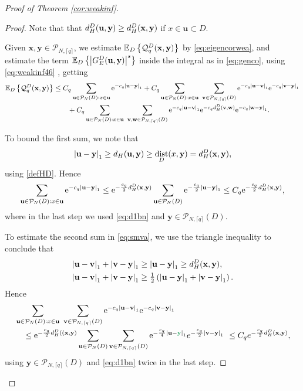 \documentclass[12pt, a4paper,reqno]{amsart}
\newcommand{\fg}{\color{ForestGreen}}
\numberwithin{equation}{section}
\DeclareMathOperator{\dist}{dist}
\newcommand\x{\mathbf{x}}
\newcommand\y{\mathbf{y}}
\renewcommand\u{\mathbf{u}}
\newcommand\e{\mathrm{e}}
\newcommand\E{\mathbb E}
\newcommand\cQ{\mathcal{Q}}
\newcommand\cP{\mathcal{P}}
\newcommand\be{\begin{equation}\begin{aligned}}
\newcommand\ee{\end{aligned}\end{equation}}
\newcommand{\abs}[1]{\left\lvert #1 \right\rvert}
\newcommand{\set}[1]{\left\{ #1 \right\}}
\newcommand{\pa}[1]{\left( #1 \right)}
\newcommand{\cl}[1]{\lceil #1 \rceil}
\newcommand{\eq}[1]{\eqref{#1}}
\begin{document}
\begin{proof}[Proof of  Theorem \ref{cor:weakinf}]
\begin{proof}
  
Note that that  $d^D_{H}({\bf u}, {\bf y})\ge d^D_{H}({\bf x}, {\bf y})$  if $x\in \u \subset D$.

 Given $\x,\y\in \cP_{N,\cl{q}}$,  we estimate $\E_{D}\set{\cQ_q^D({\bf x},{\bf y})}$ by  \eqref{eq:eigencorwea}, and estimate the term 
$\E_{D}\set{\abs{G_E^D ({\bf u},{\bf y})}^s}$ inside the integral as in \eqref{eq:genco}, using \eq{eq:weakinf46} ,  getting
\be \label{eq:smva}
\E_{D}\set{\cQ_q^D({\bf x},{\bf y})}&\le C_q \sum_{{\bf u}\in \cP_N(D): x\in {\bf u}}\e^{-c_q\abs{{\bf u}-{\bf y}}_1}+C_q  \sum_{{\bf u}\in \cP_N(D): x\in {\bf u}}\ \sum_{{\bf v}\in \cP_{N,\cl{q}}(D)}\e^{-c_q\abs{{\bf u}-{\bf v}}_1}\e^{-c_q\abs{{\bf v}-{\bf y}}_1}\\& \quad  \quad +C_q\sum_{{\bf u}\in \cP_N(D): x\in {\bf u}}\ \sum_{{\bf v},{\bf w}\in \cP_{N,\cl{q}}(D)}\e^{-c_q\abs{{\bf u}-{\bf v}}_1}\e^{-c_qd^D_H\pa{{\bf v},{\bf w}}}\e^{-c_q\abs{{\bf w}-{\bf y}}_1}.
\ee



To bound the first sum, we note that 
\be\label{defHD32}
\abs{{\bf u}-{\bf y}}_1\ge d_H({{\bf u},{\bf y}})\ge  \dist_D (x, {\bf y})=d_{H}^D({\bf x}, {\bf y}),
\ee
using \eqref{defHD}. Hence 
\be\label{eq:smva2}
\sum_{{\bf u}\in \cP_N(D): x\in {\bf u}}\e^{-c_q\abs{{\bf u}-{\bf y}}_1} \le \e^{-\frac {c_q}2d_{H}^D({\bf x}, {\bf y})}\sum_{{\bf u}\in \cP_N(D)} \e^{-\frac {c_q}2\abs{{\bf u}-{\bf y}}_1}   \le   C_{q} \e^{-\frac  {c_q} 2d_{H}^D({\bf x}, {\bf y})},
\ee
 where in the last step we used \eqref{eq:d1bn}  and $\y\in \cP_{N,\cl{q}}(D)$.
 
 To estimate the second sum in \eqref{eq:smva}, we use  the triangle inequality to conclude that 
\be
\abs{{\bf u}-{\bf v}}_1+\abs{{\bf v}-{\bf y}}_1&\ge \abs{{\bf u}-{\bf y}}_1\ge d_{H}^D({\bf x},{\bf y}),\\
\abs{{\bf u}-{\bf v}}_1+\abs{{\bf v}-{\bf y}}_1&\ge \tfrac12\pa{\abs{{\bf u}-{\bf y}}_1+\abs{{\bf v}-{\bf y}}_1}.
\ee
Hence
\be\label{eq:smva3}
& \sum_{{\bf u}\in \cP_N(D): x\in {\bf u}}\ \sum_{{\bf v}\in \cP_{N,\cl{q}}(D)}\e^{-c_q\abs{{\bf u}-{\bf v}}_1}\e^{-c_q\abs{{\bf v}-{\bf y}}_1}\\
 & \quad \le \e^{-\frac {c_q}2d_{H}^D(({\bf x},{\bf y})} \sum_{{\bf u}\in \cP_N(D)}\sum_{{\bf v}\in \cP_{N,\cl{q}}(D)}\e^{-\frac {c_q}4\abs{{\bf u}-{\fg {\bf y}}}_1}e^{-\frac {c_q}2\abs{{\bf v}-{\bf y}}_1}\
 \le  C_qe^{-\frac {c_q}2 d_{H}^D({\bf x}, {\bf y})},
\ee
using   $\y\in \cP_{N,\cl{q}}(D)$  and \eqref{eq:d1bn}  twice in the last step.


\end{proof}
\end{proof}
\end{document}
